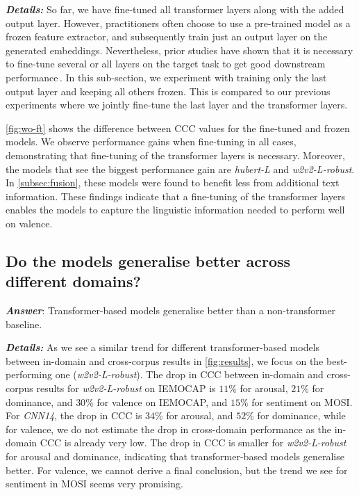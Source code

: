 \documentclass{article}
\newcommand\cnn{\mbox{\emph{CNN14}}}
\newcommand\hlarge{\mbox{\emph{hubert-L}}}
\newcommand\wrobust{\mbox{\emph{w2v2-L-robust}}}
\newcommand\iemocap{\mbox{IEMOCAP}}
\newcommand\mosi{\mbox{MOSI}}
\begin{document}
\noindent
\emph{\textbf{Details:}}
So far, we have fine-tuned all transformer layers along with the added output layer.
However, 
practitioners often choose to use a pre-trained model as a frozen feature extractor,
and subsequently train just an output layer on the generated embeddings.
Nevertheless, prior studies have shown
that it is necessary to fine-tune several or all layers on the target task
to get good downstream performance\,\citep{kong2019panns, wang2021finetuned, liu2020mockingjay, triantafyllopoulos2021role}.
In this sub-section,
we experiment with training only the last output layer and keeping all others frozen.
This is compared to our previous experiments
where we jointly fine-tune the last layer and the transformer layers.

\cref{fig:wo-ft} shows the difference between \ac{CCC} values
for the fine-tuned and frozen models.
We observe performance gains when fine-tuning in all cases,
demonstrating that fine-tuning of the transformer layers is necessary.
Moreover, the models that see the biggest performance gain 
are {\hlarge} and {\wrobust}.
In \cref{subsec:fusion},
these models were found to benefit less from additional text information.
These findings indicate
that a fine-tuning of the transformer layers
enables the models to capture the linguistic information
needed to perform well on valence.




\subsection{Do the models generalise better across different domains?}
\label{subsec:generalisation}

\emph{\textbf{Answer}}:
Transformer-based models generalise better than a non-transformer baseline.

\noindent
\emph{\textbf{Details:}}
As we see a similar trend for different transformer-based models
between in-domain and cross-corpus results in \cref{fig:results},
we focus on the best-performing one ({\wrobust}).
The drop in \ac{CCC} between in-domain and cross-corpus results for {\wrobust} on {\iemocap} is $11$\% for arousal,
$21$\% for dominance,
and $30$\% for valence on IEMOCAP, and $15$\% for sentiment on {\mosi}.
For {\cnn}, the drop in \ac{CCC} is $34$\% for arousal,
and $52$\% for dominance, while for valence,
we do not estimate the drop in cross-domain performance
as the in-domain \ac{CCC} is already very low.
The drop in \ac{CCC} is smaller for {\wrobust} for arousal and dominance,
indicating that transformer-based models generalise better.
For valence, we cannot derive a final conclusion,
but the trend we see for sentiment in {\mosi} seems very promising.
\end{document}
